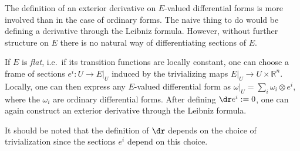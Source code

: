     \begin{construct}\label{bundle:twisted_differential}
        The definition of an exterior derivative on $E$-valued differential forms is more involved than in the case of ordinary forms. The naive thing to do would be defining a derivative through the Leibniz formula. However, without further structure on $E$ there is no natural way of differentiating sections of $E$.

        If $E$ is \textit{flat}, i.e.~if its transition functions are locally constant, one can choose a frame of sections $e^i:U\rightarrow E|_U$ induced by the trivializing maps $E|_U\rightarrow U\times\mathbb{R}^n$. Locally, one can then express any $E$-valued differential form as $\omega|_U=\sum_i\omega_i\otimes e^i$, where the $\omega_i$ are ordinary differential forms. After defining $\dr e^i:=0$, one can again construct an exterior derivative through the Leibniz formula.
    \end{construct}
    \begin{remark}
        It should be noted that the definition of $\dr$ depends on the choice of trivialization since the sections $e^i$ depend on this choice.
    \end{remark}

